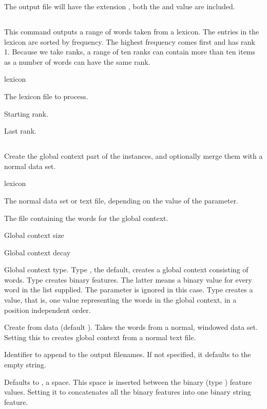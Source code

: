 \documentclass[a4paper,10pt,twoside]{report}
\begin{document}
The output file will have the extension , both the
 and  value are included.

\subsection{}

This command outputs a range of words taken from a lexicon. The
entries in the lexicon are sorted by frequency. The highest frequency
comes first and has rank 1.  Because we take ranks, a range of ten
ranks can contain more than ten items as a number of words can have
the same rank.

\begin{varlist}{lexicon}
\item[lexicon] The lexicon file to process.
\item[n] Starting rank.
\item[m] Last rank.
\end{varlist}

\subsection{}

Create the global context part of the instances, and optionally merge
them with a normal data set.

\begin{varlist}{lexicon}
\item[filename] The normal data set or text file, depending on the
  value of the  parameter.
\item[range] The file containing the words for the global context.
\item[gcs] Global context size
\item[gcd] Global context decay
\item[gct] Global context type. Type , the default, creates a
  global context consisting of words. Type  creates binary
  features. The latter means a binary value for every word in the
   list supplied. The  parameter is ignored in
  this case. Type  creates a  value, that is, one
  value representing the words in the global context, in a position
  independent order.
\item[fd] Create from data (default ). Takes the words from a
  normal, windowed data set. Setting this to  creates global
  context from a normal text file.
\item[id] Identifier to append to the output filenames. If not
  specified, it defaults to the empty string.
\item[gc\_sep] Defaults to , a space. This space is inserted
  between the binary (type ) feature values. Setting it to
   concatenates all the binary features into one binary string
  feature. 
\end{varlist}
\end{document}
